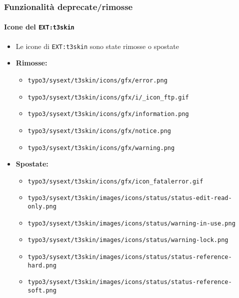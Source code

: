 
\begin{frame}[fragile]
	\frametitle{Funzionalità deprecate/rimosse}
	\framesubtitle{Icone del \texttt{EXT:t3skin}}

	\begin{itemize}

		\item Le icone di \texttt{EXT:t3skin} sono state rimosse o spostate
		\item \textbf{Rimosse:}

			\begin{itemize}
				\item \smaller\texttt{typo3/sysext/t3skin/icons/gfx/error.png}
				\item \texttt{typo3/sysext/t3skin/icons/gfx/i/\_icon\_ftp.gif}
				\item \texttt{typo3/sysext/t3skin/icons/gfx/information.png}
				\item \texttt{typo3/sysext/t3skin/icons/gfx/notice.png}
				\item \texttt{typo3/sysext/t3skin/icons/gfx/warning.png}
			\end{itemize}

		\item \textbf{Spostate:}

			\begin{itemize}
				\item \smaller\texttt{typo3/sysext/t3skin/icons/gfx/icon\_fatalerror.gif}
				\item \texttt{typo3/sysext/t3skin/images/icons/status/status-edit-read-only.png}
				\item \texttt{typo3/sysext/t3skin/images/icons/status/warning-in-use.png}
				\item \texttt{typo3/sysext/t3skin/images/icons/status/warning-lock.png}
				\item \texttt{typo3/sysext/t3skin/images/icons/status/status-reference-hard.png}
				\item \texttt{typo3/sysext/t3skin/images/icons/status/status-reference-soft.png}
			\end{itemize}

	\end{itemize}

\end{frame}

